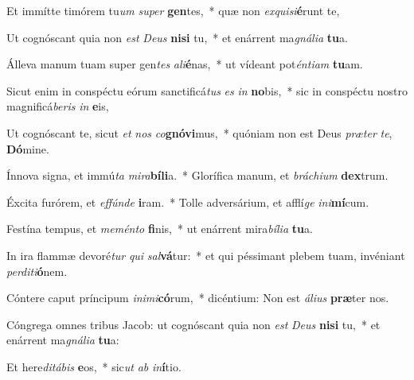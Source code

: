 \item Et immítte timórem tu\textit{um} \textit{su}\textit{per} \textbf{gen}tes,~* quæ non \textit{ex}\textit{qui}\textit{si}\textbf{é}runt te,
\item Ut cognóscant quia non \textit{est} \textit{De}\textit{us} \textbf{ni}\textbf{si} tu,~* et enárrent ma\textit{gná}\textit{li}\textit{a} \textbf{tu}a.
\item Álleva manum tuam super gen\textit{tes} \textit{a}\textit{li}\textbf{é}nas,~* ut vídeant pot\textit{én}\textit{ti}\textit{am} \textbf{tu}am.
\item Sicut enim in conspéctu eórum sanctificá\textit{tus} \textit{es} \textit{in} \textbf{no}bis,~* sic in conspéctu nostro magnificá\textit{be}\textit{ris} \textit{in} \textbf{e}is,
\item Ut cognóscant te, sicut \textit{et} \textit{nos} \textit{co}\textbf{gnó}\textbf{vi}mus,~* quóniam non est Deus \textit{præ}\textit{ter} \textit{te}, \textbf{Dó}mine.
\item Ínnova signa, et immú\textit{ta} \textit{mi}\textit{ra}\textbf{bí}\textbf{li}a.~* Glorífica manum, et \textit{brá}\textit{chi}\textit{um} \textbf{dex}trum.
\item Éxcita furórem, et \textit{ef}\textit{fún}\textit{de} \textbf{i}ram.~* Tolle adversárium, et afflí\textit{ge} \textit{in}\textit{i}\textbf{mí}cum.
\item Festína tempus, et \textit{me}\textit{mén}\textit{to} \textbf{fi}nis,~* ut enárrent mira\textit{bí}\textit{li}\textit{a} \textbf{tu}a.
\item In ira flammæ devoré\textit{tur} \textit{qui} \textit{sal}\textbf{vá}tur:~* et qui péssimant plebem tuam, invéniant \textit{per}\textit{di}\textit{ti}\textbf{ó}nem.
\item Cóntere caput príncipum \textit{in}\textit{i}\textit{mi}\textbf{có}rum,~* dicéntium: Non est \textit{á}\textit{li}\textit{us} \textbf{præ}ter nos.
\item Cóngrega omnes tribus Jacob: ut cognóscant quia non \textit{est} \textit{De}\textit{us} \textbf{ni}\textbf{si} tu,~* et enárrent ma\textit{gná}\textit{li}\textit{a} \textbf{tu}a:
\item Et here\textit{di}\textit{tá}\textit{bis} \textbf{e}os,~* sic\textit{ut} \textit{ab} \textit{in}\textbf{í}tio.
